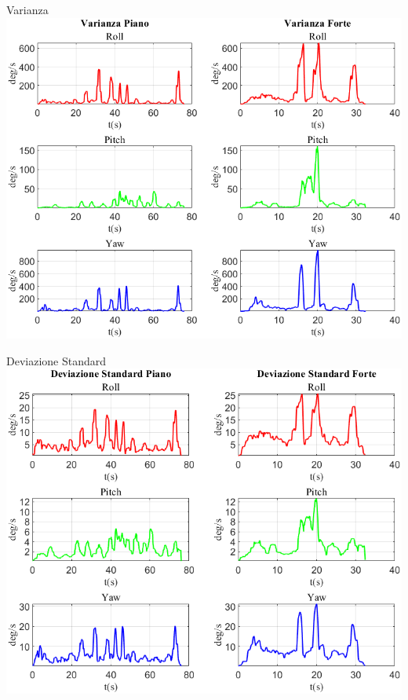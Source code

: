 	\begin{frame}{{Varianza}}
		\centering\includegraphics[height=.8\textheight]{figure/VAng/Varianza}
	\end{frame}
	
	\begin{frame}{{Deviazione Standard}}
		\centering\includegraphics[height=.8\textheight]{figure/VAng/Deviazione Standard}
	\end{frame}
	
